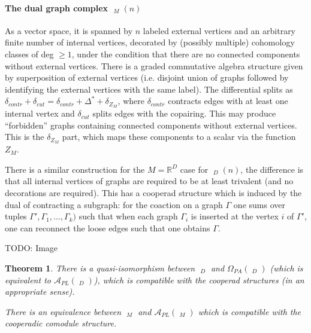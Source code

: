 \documentclass{scrartcl}
\theoremstyle{plain}
\newtheorem{theorem}{Theorem}[section]
\theoremstyle{definition}
\newcommand{\R}{\mathbb R}
\newcommand{\Apl}{\mathcal A_{PL}}
\DeclareMathOperator{\cConf}{\overline{Conf}}
\DeclareMathOperator{\coGraphs}{{}^*Graphs}
\begin{document}
\paragraph{The dual graph complex $\coGraphs_M(n)$} As a vector space, it is spanned by $n$ labeled external vertices and an arbitrary finite number of internal vertices, decorated by (possibly multiple) cohomology classes of deg $\geq 1$, under the condition that there are no connected components without external vertices. There is a graded commutative algebra structure given by superposition of external vertices (i.e. disjoint union of graphs followed by identifying the external vertices with the same label). The differential splits as $\delta_{contr} + \delta_{cut} = \delta_{contr} + \Delta^* + \delta_{Z_M}$, where $\delta_{contr}$ contracts edges with at least one internal vertex and $\delta_{cut}$ splits edges with the copairing. This may produce ``forbidden'' graphs containing connected components without external vertices. This is the $\delta_{Z_M}$ part, which maps these components to a scalar via the function $Z_M$.

There is a similar construction for the $M=\R^D$ case for $\coGraphs_D(n)$, the difference is that all internal vertices of graphs are required to be at least trivalent (and no decorations are required). This has a cooperad structure which is induced by the dual of contracting a subgraph: for the coaction on a graph $\Gamma$ one sums over tuples $\Gamma', \Gamma_1, \dots, \Gamma_k)$ such that when each graph $\Gamma_i$ is inserted at the vertex $i$ of $\Gamma'$, one can reconnect the loose edges such that one obtains $\Gamma$.  

TODO: Image

\begin{theorem}
There is a quasi-isomorphism between $\coGraphs_D$ and $\Omega_{PA}(\cConf_D)$ (which is equivalent to $\Apl(\cConf_D)$), which is compatible with the cooperad structures (in an appropriate sense).

There is an equivalence between $\coGraphs_M$ and $\mathcal A_{PL}(\cConf_M)$ which is compatible with the cooperadic comodule structure. 
\end{theorem}
\end{document}
